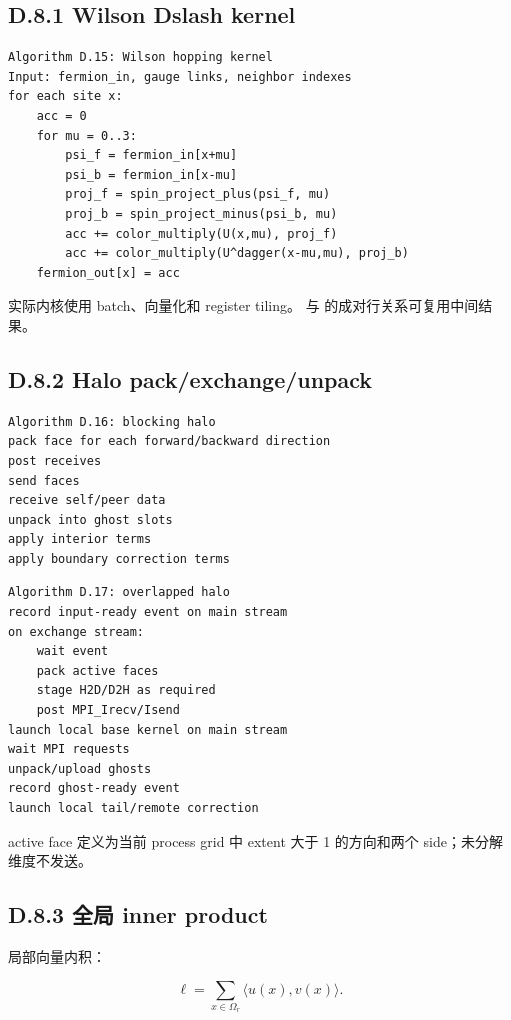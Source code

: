 \documentclass[UTF8,a4paper,10pt]{ctexart}
\DeclareRobustCommand{\pycode}[1]{\texorpdfstring{\texttt{\seqsplit{#1}}}{#1}}
\begin{document}
\subsection{D.8.1 Wilson Dslash kernel}
\begin{Verbatim}[breaklines=true,breakanywhere=true,fontsize=\scriptsize]
Algorithm D.15: Wilson hopping kernel
Input: fermion_in, gauge links, neighbor indexes
for each site x:
    acc = 0
    for mu = 0..3:
        psi_f = fermion_in[x+mu]
        psi_b = fermion_in[x-mu]
        proj_f = spin_project_plus(psi_f, mu)
        proj_b = spin_project_minus(psi_b, mu)
        acc += color_multiply(U(x,mu), proj_f)
        acc += color_multiply(U^dagger(x-mu,mu), proj_b)
    fermion_out[x] = acc
\end{Verbatim}
实际内核使用 batch、向量化和 register tiling。\pycode{1-gamma\_mu} 与 \pycode{1+gamma\_mu} 的成对行关系可复用中间结果。

\subsection{D.8.2 Halo pack/exchange/unpack}
\begin{Verbatim}[breaklines=true,breakanywhere=true,fontsize=\scriptsize]
Algorithm D.16: blocking halo
pack face for each forward/backward direction
post receives
send faces
receive self/peer data
unpack into ghost slots
apply interior terms
apply boundary correction terms
\end{Verbatim}
\begin{Verbatim}[breaklines=true,breakanywhere=true,fontsize=\scriptsize]
Algorithm D.17: overlapped halo
record input-ready event on main stream
on exchange stream:
    wait event
    pack active faces
    stage H2D/D2H as required
    post MPI_Irecv/Isend
launch local base kernel on main stream
wait MPI requests
unpack/upload ghosts
record ghost-ready event
launch local tail/remote correction
\end{Verbatim}
active face 定义为当前 process grid 中 extent 大于 1 的方向和两个 side；未分解维度不发送。

\subsection{D.8.3 全局 inner product}
局部向量内积：

\begin{displaymath}
\ell=\sum_{x\in\Omega_r} \langle u(x),v(x)\rangle.
\end{displaymath}
\end{document}

